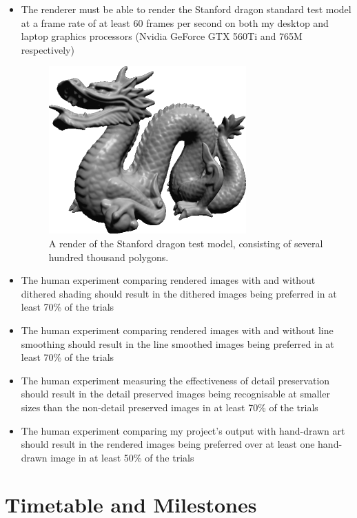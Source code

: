 \documentclass[12pt,twoside,notitlepage]{report}
\begin{document}
\begin{itemize}

\item The renderer must be able to render the Stanford dragon standard test model at a frame rate of at least 60 frames per second on both my desktop and laptop graphics processors (Nvidia GeForce GTX 560Ti and 765M respectively)

\begin{figure}[h!]
\centering
\includegraphics{stanforddragon}
\caption{A render of the Stanford dragon test model, consisting of several hundred thousand polygons.}
\end{figure}

\item The human experiment comparing rendered images with and without dithered shading should result in the dithered images being preferred in at least 70\% of the trials

\item The human experiment comparing rendered images with and without line smoothing should result in the line smoothed images being preferred in at least 70\% of the trials

\item The human experiment measuring the effectiveness of detail preservation should result in the detail preserved images being recognisable at smaller sizes than the non-detail preserved images in at least 70\% of the trials

\item The human experiment comparing my project's output with hand-drawn art should result in the rendered images being preferred over at least one hand-drawn image in at least 50\% of the trials

\end{itemize}

\section*{Timetable and Milestones}
\end{document}
